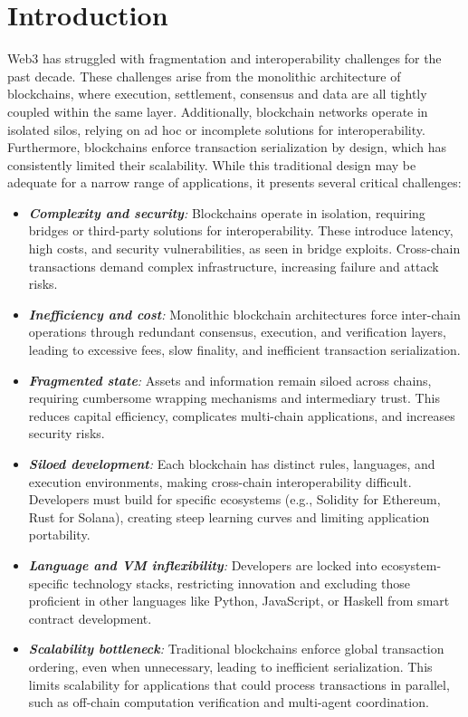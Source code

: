 \documentclass{article}
\begin{document}
\newpage

\section{Introduction}

Web3 has struggled with fragmentation and interoperability challenges for the past decade. These challenges arise from the monolithic architecture of blockchains, where execution, settlement, consensus and data are all tightly coupled within the same layer. Additionally, blockchain networks operate in isolated silos, relying on ad hoc or incomplete solutions for interoperability. Furthermore, blockchains enforce transaction serialization by design, which has consistently limited their scalability. While this traditional design may be adequate for a narrow range of applications, it presents several critical challenges:

\begin{itemize}
\item \textit{\textbf{Complexity and security}:}
Blockchains operate in isolation, requiring bridges or third-party solutions for interoperability. These introduce latency, high costs, and security vulnerabilities, as seen in bridge exploits. Cross-chain transactions demand complex infrastructure, increasing failure and attack risks.

\item \textit{\textbf{Inefficiency and cost}:}
Monolithic blockchain architectures force inter-chain operations through redundant consensus, execution, and verification layers, leading to excessive fees, slow finality, and inefficient transaction serialization.

\item \textit{\textbf{Fragmented state}:}
Assets and information remain siloed across chains, requiring cumbersome wrapping mechanisms and intermediary trust. This reduces capital efficiency, complicates multi-chain applications, and increases security risks.

\item \textit{\textbf{Siloed development}:}
Each blockchain has distinct rules, languages, and execution environments, making cross-chain interoperability difficult. Developers must build for specific ecosystems (e.g., Solidity for Ethereum, Rust for Solana), creating steep learning curves and limiting application portability.

\item \textit{\textbf{Language and VM inflexibility}:}
Developers are locked into ecosystem-specific technology stacks, restricting innovation and excluding those proficient in other languages like Python, JavaScript, or Haskell from smart contract development.

\item \textit{\textbf{Scalability bottleneck}:}
Traditional blockchains enforce global transaction ordering, even when unnecessary, leading to inefficient serialization. This limits scalability for applications that could process transactions in parallel, such as off-chain computation verification and multi-agent coordination.
\end{itemize}
\end{document}
